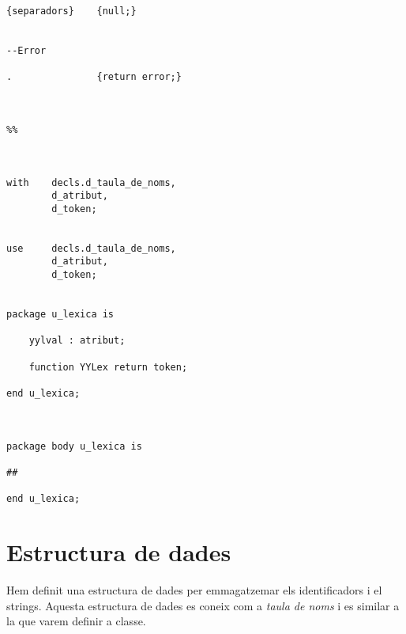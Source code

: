 \documentclass[10pt]{report}
\begin{document}
\begin{lstlisting}[style=Ada]
{separadors}    {null;}


--Error

.               {return error;}



%%



with    decls.d_taula_de_noms,
        d_atribut,
        d_token;
        

use     decls.d_taula_de_noms,
        d_atribut,
        d_token;


package u_lexica is

    yylval : atribut;

    function YYLex return token;
    
end u_lexica;



package body u_lexica is

##

end u_lexica;

    \end{lstlisting}
    
    \newpage
    \chapter{Estructura de dades}
        Hem definit una estructura de dades per emmagatzemar els identificadors i el strings. Aquesta estructura de dades es coneix com a \textit{taula de noms} i es similar a la que varem definir a classe.
        
    
\end{document}
